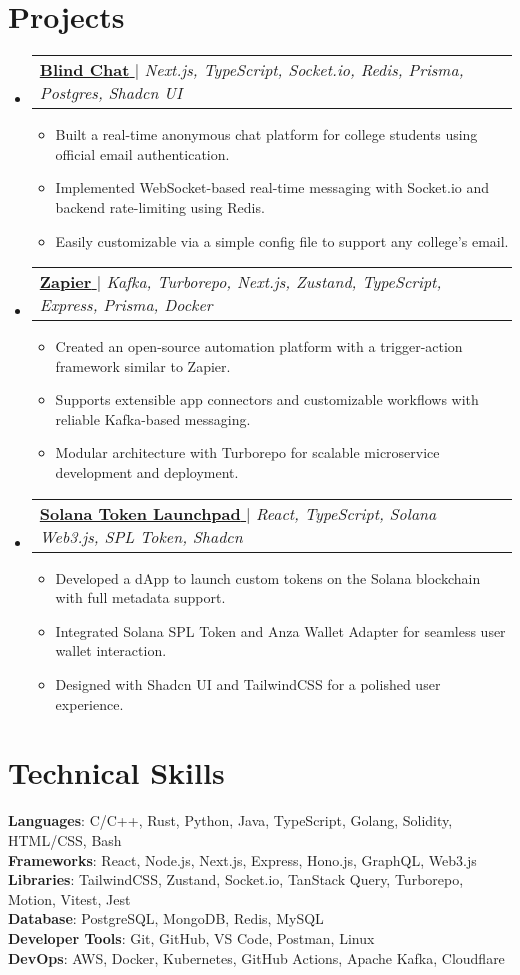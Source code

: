 \documentclass[a4paper,11pt]{article}
\makeatletter
\newcommand{\resumeItem}[1]{
  \item\small{{#1 \vspace{-2pt}}}
}
\newcommand{\resumeProjectHeading}[2]{
    \item
    \begin{tabular*}{0.97\textwidth}{l@{\extracolsep{\fill}}r}
      \small#1 & #2 \\
    \end{tabular*}\vspace{-7pt}
}
\newcommand{\resumeItemListStart}{\begin{itemize}}
\newcommand{\resumeItemListEnd}{\end{itemize}\vspace{-5pt}}
\newcommand{\resumeSubHeadingListStart}{\begin{itemize}[leftmargin=0.15in, label={}]}
\newcommand{\resumeSubHeadingListEnd}{\end{itemize}}
\newcommand{\projectLink}[3]{\href{#2}{\textbf{#1} \faExternalLink} $|$ \emph{#3}}
\makeatother
\begin{document}
\section{Projects}
\resumeSubHeadingListStart
  \resumeProjectHeading{\projectLink{Blind Chat}{https://blind-curaj.vercel.app/}{Next.js, TypeScript, Socket.io, Redis, Prisma, Postgres, Shadcn UI}}{}
    \resumeItemListStart
      \resumeItem{Built a real-time anonymous chat platform for college students using official email authentication.}
      \resumeItem{Implemented WebSocket-based real-time messaging with Socket.io and backend rate-limiting using Redis.}
      \resumeItem{Easily customizable via a simple config file to support any college's email.}
    \resumeItemListEnd
  \resumeProjectHeading{\projectLink{Zapier}{https://github.com/idityaGE/_zapier}{Kafka, Turborepo, Next.js, Zustand, TypeScript, Express, Prisma, Docker}}{}
    \resumeItemListStart
      \resumeItem{Created an open-source automation platform with a trigger-action framework similar to Zapier.}
      \resumeItem{Supports extensible app connectors and customizable workflows with reliable Kafka-based messaging.}
      \resumeItem{Modular architecture with Turborepo for scalable microservice development and deployment.}
    \resumeItemListEnd
  \resumeProjectHeading{\projectLink{Solana Token Launchpad}{https://solana-token-lauchpad.vercel.app/}{React, TypeScript, Solana Web3.js, SPL Token, Shadcn}}{}
    \resumeItemListStart
      \resumeItem{Developed a dApp to launch custom tokens on the Solana blockchain with full metadata support.}
      \resumeItem{Integrated Solana SPL Token and Anza Wallet Adapter for seamless user wallet interaction.}
      \resumeItem{Designed with Shadcn UI and TailwindCSS for a polished user experience.}
    \resumeItemListEnd
\resumeSubHeadingListEnd

\section{Technical Skills}
\begin{itemize}[leftmargin=0.15in, label={}]
  \small{\item{
    \textbf{Languages}{: C/C++, Rust, Python, Java, TypeScript, Golang, Solidity, HTML/CSS, Bash} \\
    \textbf{Frameworks}{: React, Node.js, Next.js, Express, Hono.js, GraphQL, Web3.js} \\
    \textbf{Libraries}{: TailwindCSS, Zustand, Socket.io, TanStack Query, Turborepo, Motion, Vitest, Jest} \\
    \textbf{Database}{: PostgreSQL, MongoDB, Redis, MySQL} \\
    \textbf{Developer Tools}{: Git, GitHub, VS Code, Postman, Linux} \\
    \textbf{DevOps}{: AWS, Docker, Kubernetes, GitHub Actions, Apache Kafka, Cloudflare}
  }}
\end{itemize}
\end{document}
